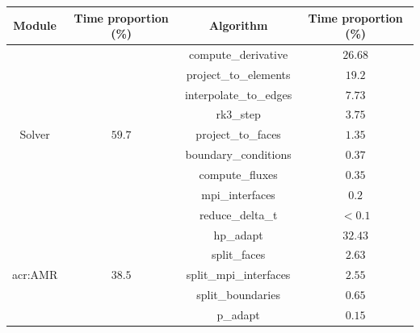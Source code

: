 \begin{table}[H]
    \centering
    \begin{tabular}{ c c c c }
        Module                              & Time proportion (\%)      & Algorithm                & Time proportion (\%) \\
        \toprule
        \multirow{9}{*}{Solver}             & \multirow{9}{*}{\(59.7\)} & compute\_derivative      & \(26.68\)            \\
                                            &                           & project\_to\_elements    & \(19.2\)             \\
                                            &                           & interpolate\_to\_edges   & \(7.73\)             \\
                                            &                           & rk3\_step                & \(3.75\)             \\
                                            &                           & project\_to\_faces       & \(1.35\)             \\
                                            &                           & boundary\_conditions     & \(0.37\)             \\
                                            &                           & compute\_fluxes          & \(0.35\)             \\
                                            &                           & mpi\_interfaces          & \(0.2\)              \\
                                            &                           & reduce\_delta\_t         & \(<0.1\)             \\
        \midrule
        \multirow{6}{*}{\Acrshort{acr:AMR}} & \multirow{6}{*}{\(38.5\)} & hp\_adapt                & \(32.43\)            \\
                                            &                           & split\_faces             & \(2.63\)             \\
                                            &                           & split\_mpi\_interfaces   & \(2.55\)             \\
                                            &                           & split\_boundaries        & \(0.65\)             \\
                                            &                           & p\_adapt                 & \(0.15\)             \\

\end{tabular}
\end{table}
